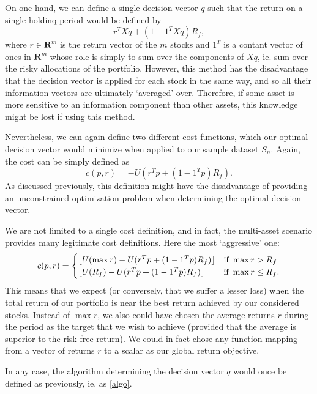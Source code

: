 \documentclass[11pt]{article}
\DeclarePairedDelimiter\floor{\lfloor}{\rfloor}
\newcommand{\real}{\bm R}
\theoremstyle{plain}
\theoremstyle{definition}
\begin{document}
On one hand, we can define a single decision vector $q$ such that the return on a single
holdinq period would be defined by
\begin{equation}
  r^{T}Xq + (1 - 1^{T}Xq)R_f,
\end{equation}
where $r\in\real^{m}$ is the return vector of the $m$ stocks and $1^T$ is a contant vector
of ones in $\real^m$ whose role is simply to sum over the components of $Xq$, ie. sum over
the risky allocations of the portfolio. However, this method has the disadvantage that the
decision vector is applied for each stock in the same way, and so all their information
vectors are ultimately `averaged' over. Therefore, if some asset is more sensitive to an
information component than other assets, this knowledge might be lost if using this
method. 

Nevertheless, we can again define two different cost functions, which our optimal decision
vector would minimize when applied to our sample dataset $S_n$. Again, the cost can be
simply defined as
\begin{equation}
  c(p,r) = -U(r^{T}p + (1 - 1^{T}p)R_f).
\end{equation}
As discussed previously, this definition might have the disadvantage of providing an
unconstrained optimization problem when determining the optimal decision vector.

We are not limited to a single cost definition, and in fact, the multi-asset scenario
provides many legitimate cost definitions. Here the most `aggressive' one:
\begin{equation}
  c(p,r) =
  \begin{cases}
    \floor{U(\max r) - U(r^{T}p + (1-1^{T}p)R_f)} & \text{if } \max r>R_f\\
    \floor{U(R_f) - U(r^{T}p + (1-1^{T}p)R_f)} &\text{if } \max r\leq R_f.
  \end{cases}  
\end{equation}
This means that we expect (or conversely, that we suffer a lesser loss) when the total
return of our portfolio is near the best return achieved by our considered stocks. Instead
of $\max r$, we also could have chosen the average returns $\bar r$ during the period as
the target that we wish to achieve (provided that the average is superior to the risk-free
return). We could in fact chose any function mapping from a vector of returns $r$ to a
scalar as our global return objective.

In any case, the algorithm determining the decision vector $q$ would once be defined as
previously, ie. as \eqref{algo}.
\end{document}
